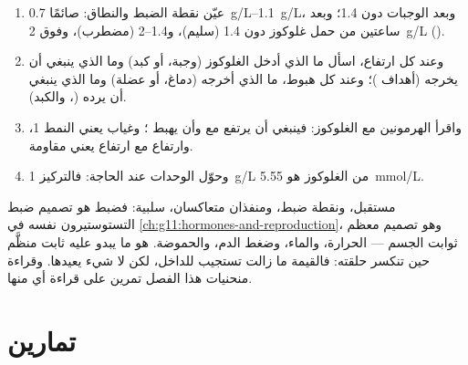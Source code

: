 \begin{method}\label{met:g12:glucose-and-diabetes:read}
\begin{enumerate}
  \item عيّن نقطة الضبط والنطاق: صائمًا \qtyrange{0.7}{1.1}{g/L}، وبعد
        الوجبات دون \num{1.4}؛ وبعد ساعتين من حمل غلوكوز دون \num{1.4}
        (سليم)، و\qtyrange{1.4}{2}{} (مضطرب)، وفوق \qty{2}{g/L} ().
  \item وعند كل ارتفاع، اسأل ما الذي أدخل الغلوكوز (وجبة، أو كبد) وما
        الذي ينبغي أن يخرجه (أهداف )؛ وعند كل هبوط، ما الذي
        أخرجه (دماغ، أو عضلة) وما الذي ينبغي أن يرده (،
        والكبد).
  \item واقرأ الهرمونين مع الغلوكوز: فينبغي أن يرتفع  مع  وأن يهبط ؛ وغياب  يعني النمط 1،
        وارتفاع  مع ارتفاع  يعني مقاومة.
  \item وحوّل الوحدات عند الحاجة: فالتركيز \qty{1}{g/L} من الغلوكوز
        هو \qty{5.55}{mmol/L}.
\end{enumerate}
\end{method}

\begin{remark}\label{rem:g12:glucose-and-diabetes:model}
مستقبل، ونقطة ضبط، ومنفذان متعاكسان،  سلبية: فضبط 
هو تصميم ضبط التستوستيرون نفسه في
\cref{ch:g11:hormones-and-reproduction}، وهو تصميم معظم ثوابت الجسم
--- الحرارة، والماء، وضغط الدم، والحموضة.  هو ما يبدو عليه
ثابت منظَّم حين تنكسر حلقته: فالقيمة ما زالت تستجيب للداخل، لكن لا شيء
يعيدها. وقراءة منحنيات هذا الفصل تمرين على قراءة أي منها.
\end{remark}

\section{تمارين}

